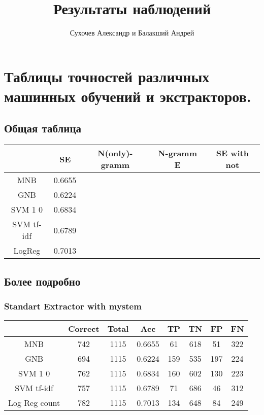 \documentclass[a4paper, 12pt]{article}
\author{Сухочев Александр и Балакший Андрей}
\title{Результаты наблюдений}
\theoremstyle{plain}
\theoremstyle{definition}
\theoremstyle{remark}
\begin{document}
\maketitle

\section{Таблицы точностей различных машинных обучений и экстракторов.}

\subsection{Общая таблица}
\begin{tabular} {|c|c|c|c|c|}
\hline
   ~~~~ & SE & N(only)-gramm & N-gramm E & SE with not \\
   \hline
  MNB & 0.6655 & & & \\
   \hline
  GNB & 0.6224 & & & \\
   \hline
  SVM 1 0 & 0.6834 & & & \\
   \hline
  SVM tf-idf & 0.6789 & & & \\
   \hline
  LogReg & 0.7013 & & & \\
\hline
\end{tabular}

\subsection{Более подробно}
\subsubsection{Standart Extractor with mystem}
\begin{tabular}{|c|c|c|c|c|c|c|c|}
\hline
  ~~~~ & Correct & Total & Acc & TP & TN & FP & FN \\
  \hline
  MNB & 742 & 1115 & 0.6655 & 61 & 618 & 51 & 322  \\
  \hline
  GNB & 694 & 1115 & 0.6224 & 159 & 535 & 197 & 224 \\
  \hline
  SVM 1 0 & 762 & 1115 & 0.6834 & 160 & 602 & 130 & 223 \\
  \hline
  SVM tf-idf & 757 & 1115 & 0.6789 & 71 & 686 & 46 & 312 \\
  \hline
  Log Reg count & 782 & 1115 & 0.7013 & 134 & 648 & 84 & 249 \\
\hline
\end{tabular}
\end{document}
